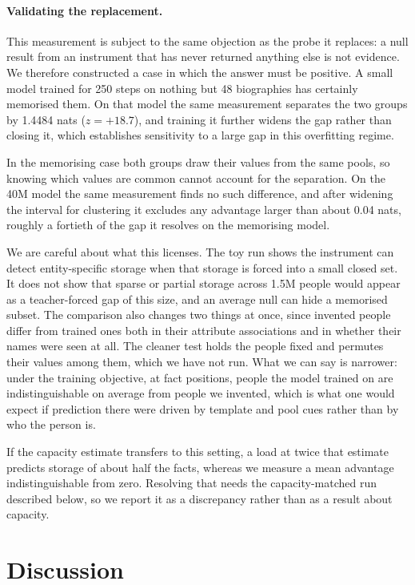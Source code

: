 \documentclass[10pt,twocolumn]{article}
\begin{document}
\paragraph{Validating the replacement.}
This measurement is subject to the same objection as the probe it replaces: a
null result from an instrument that has never returned anything else is not
evidence. We therefore constructed a case in which the answer must be positive.
A small model trained for 250 steps on nothing but 48 biographies has certainly
memorised them. On that model the same measurement separates the two groups by
1.4484 nats ($z=+18.7$), and training it further widens the gap rather than
closing it, which establishes sensitivity to a large gap in this overfitting
regime.

In the memorising case both groups draw their values from the same pools, so
knowing which values are common cannot account for the separation. On the 40M
model the same measurement finds no such difference, and after widening the
interval for clustering it excludes any advantage larger than about 0.04 nats,
roughly a fortieth of the gap it resolves on the memorising model.

We are careful about what this licenses. The toy run shows the instrument can
detect entity-specific storage when that storage is forced into a small closed
set. It does not show that sparse or partial storage across 1.5M people would
appear as a teacher-forced gap of this size, and an average null can hide a
memorised subset. The comparison also changes two things at once, since
invented people differ from trained ones both in their attribute associations
and in whether their names were seen at all. The cleaner test holds the people
fixed and permutes their values among them, which we have not run. What we can
say is narrower: under the training objective, at fact positions, people the
model trained on are indistinguishable on average from people we invented,
which is what one would expect if prediction there were driven by template and
pool cues rather than by who the person is.

If the capacity estimate transfers to this setting, a load at twice that
estimate predicts storage of about half the facts, whereas we measure a mean
advantage indistinguishable from zero. Resolving that needs the
capacity-matched run described below, so we report it as a discrepancy rather
than as a result about capacity.

\section{Discussion}
\label{sec:disc}
\end{document}
